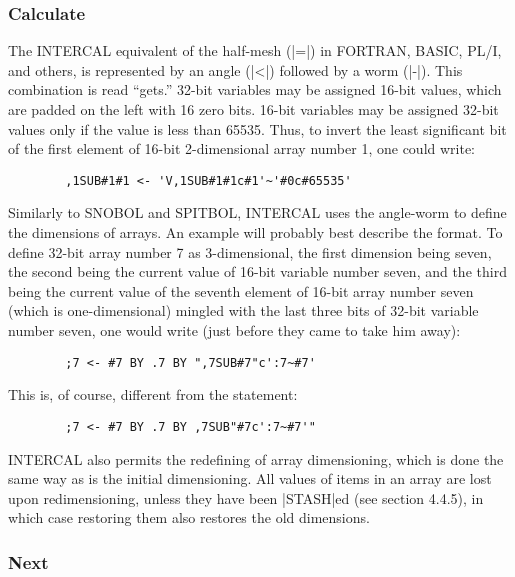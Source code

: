 \subsubsection{Calculate}

The INTERCAL equivalent of the half-mesh (|=|) in FORTRAN, BASIC, PL/I, and
others, is represented by an angle (|<|) followed by a worm (|-|).  This
combination is read ``gets.''  32-bit variables may be assigned 16-bit
values, which are padded on the left with 16 zero bits.  16-bit variables
may be assigned 32-bit values only if the value is less than 65535.  Thus,
to invert the least significant bit of the first element of 16-bit
2-dimensional array number 1, one could write:

\begin{verbatim}
        ,1SUB#1#1 <- 'V,1SUB#1#1c#1'~'#0c#65535'
\end{verbatim}

Similarly to SNOBOL and SPITBOL, INTERCAL uses the angle-worm to define the
dimensions of arrays.  An example will probably best describe the format.
To define 32-bit array number 7 as 3-dimensional, the first dimension being
seven, the second being the current value of 16-bit variable number seven,
and the third being the current value of the seventh element of 16-bit
array number seven (which is one-dimensional) mingled with the last three
bits of 32-bit variable number seven, one would write (just before they
came to take him away):

\begin{verbatim}
        ;7 <- #7 BY .7 BY ",7SUB#7"c':7~#7'
\end{verbatim}
This is, of course, different from the statement:

\begin{verbatim}
        ;7 <- #7 BY .7 BY ,7SUB"#7c':7~#7'"
\end{verbatim}

INTERCAL also permits the redefining of array dimensioning, which is done
the same way as is the initial dimensioning.  All values of items in an
array are lost upon redimensioning, unless they have been |STASH|ed (see
section 4.4.5), in which case restoring them also restores the old
dimensions.







\subsubsection{Next}

